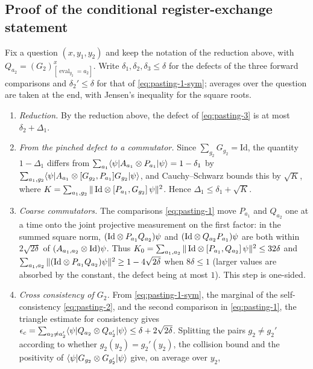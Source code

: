 \documentclass[11pt]{article}
\begin{document}
\subsection*{Proof of the conditional register-exchange statement}


Fix a question $(x,y_1,y_2)$ and keep the notation of the reduction above,
with $Q_{a_2}=(G_2)^x_{[\operatorname{eval}_{y_2}=a_2]}$.  Write
$\delta_1,\delta_2,\delta_3\le\delta$ for the defects of the three forward
comparisons and $\delta_2'\le\delta$ for that of \eqref{eq:pasting-1-sym};
averages over the question are taken at the end, with Jensen's inequality for
the square roots.
\begin{enumerate}
  \item \emph{Reduction.}  By the reduction above, the defect of
  \eqref{eq:pasting-3} is at most $\delta_2+\Delta_1$.
  \item \emph{From the pinched defect to a commutator.}  Since
  $\sum_{g_2}G_{g_2}=\mathrm{Id}$, the quantity $1-\Delta_1$ differs from
  $\sum_{a_1}\langle\psi|A_{a_1}\otimes P_{a_1}|\psi\rangle=1-\delta_1$ by
  $\sum_{a_1,g_2}\langle\psi|A_{a_1}\otimes[G_{g_2},P_{a_1}]G_{g_2}|\psi\rangle$,
  and Cauchy--Schwarz bounds this by $\sqrt K$, where
  $K=\sum_{a_1,g_2}\|\,\mathrm{Id}\otimes[P_{a_1},G_{g_2}]\,\psi\|^2$.  Hence
  $\Delta_1\le\delta_1+\sqrt K$.
  \item \emph{Coarse commutators.}  The comparisons \eqref{eq:pasting-1}
  move $P_{a_1}$ and $Q_{a_2}$ one at a time onto the joint projective
  measurement on the first factor: in the summed square norm,
  $(\mathrm{Id}\otimes P_{a_1}Q_{a_2})\psi$ and
  $(\mathrm{Id}\otimes Q_{a_2}P_{a_1})\psi$ are both within $2\sqrt{2\delta}$ of
  $(A_{a_1,a_2}\otimes\mathrm{Id})\psi$.  Thus
  $K_0=\sum_{a_1,a_2}\|\,\mathrm{Id}\otimes[P_{a_1},Q_{a_2}]\,\psi\|^2\le32\delta$
  and $\sum_{a_1,a_2}\|(\mathrm{Id}\otimes P_{a_1}Q_{a_2})\psi\|^2\ge
  1-4\sqrt{2\delta}$ when $8\delta\le1$ (larger values are absorbed by the
  constant, the defect being at most $1$).  This step is one-sided.
  \item \emph{Cross consistency of $G_2$.}  From \eqref{eq:pasting-1-sym},
  the marginal of the self-consistency \eqref{eq:pasting-2}, and the second
  comparison in \eqref{eq:pasting-1}, the triangle estimate for consistency
  gives
  $\epsilon_c=\sum_{a_2\neq a_2'}\langle\psi|Q_{a_2}\otimes Q_{a_2'}|\psi\rangle
  \le\delta+2\sqrt{2\delta}$.  Splitting the pairs $g_2\neq g_2'$ according
  to whether $g_2(y_2)=g_2'(y_2)$, the collision bound and the positivity of
  $\langle\psi|G_{g_2}\otimes G_{g_2'}|\psi\rangle$ give, on average over $y_2$,

\end{enumerate}
\end{document}
